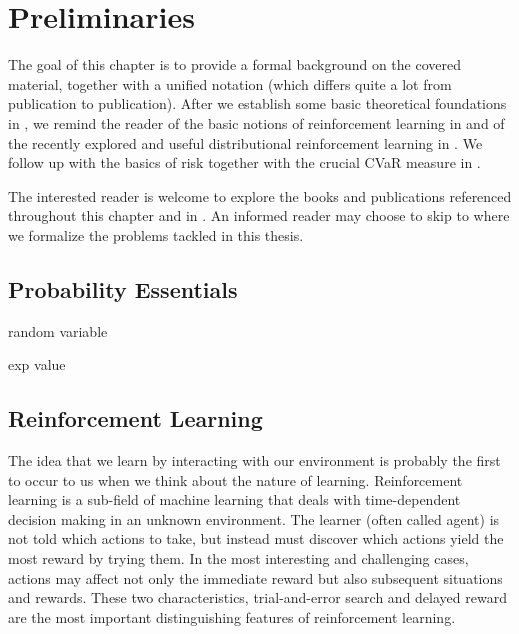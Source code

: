 \chapter{Preliminaries}\label{ch:prelim}

The goal of this chapter is to provide a formal background on the covered material, together with a unified notation (which differs quite a lot from publication to publication). After we establish some basic theoretical foundations in , we remind the reader of the basic notions of reinforcement learning in  and of the recently explored and useful distributional reinforcement learning in . We follow up with the basics of risk together with the crucial CVaR measure in .

The interested reader is welcome to explore the books and publications referenced throughout this chapter and in . An informed reader may choose to skip to  where we formalize the problems tackled in this thesis.

\section{Probability Essentials}\label{sec:prelim:essentials}

random variable

exp value







\section{Reinforcement Learning}\label{sec:prelim:rl}

The idea that we learn by interacting with our environment is probably the first to occur to us when we think about the nature of learning. Reinforcement learning \cite{sutton1998reinforcement} is a sub-field of machine learning that deals with time-dependent decision making in an unknown environment. The learner (often called agent) is not told which actions to take, but instead must discover which actions yield the most reward by trying them. In the most interesting and challenging cases, actions may affect not only the immediate reward but also subsequent situations and rewards. These two characteristics, trial-and-error search and delayed reward are the most important distinguishing features of reinforcement learning.

